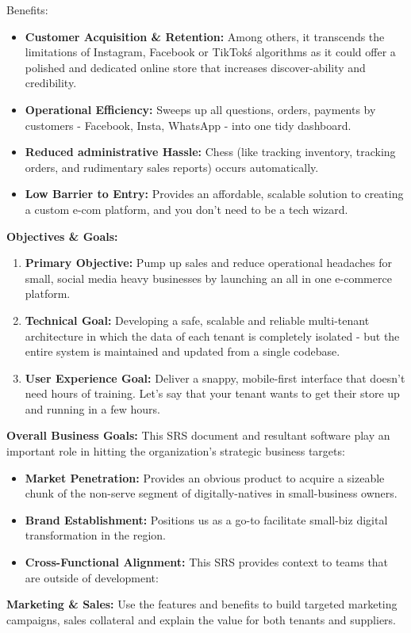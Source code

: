 Benefits:  
\begin{itemize}
For Small Businesspersons (Tenants):  
    \item \textbf{Customer Acquisition \& Retention:} Among others, it transcends the limitations of Instagram, Facebook or TikTok\'s algorithms as it could offer a polished and dedicated online store that increases discover-ability and credibility.  
    \item \textbf{Operational Efficiency:} Sweeps up all questions, orders, payments by customers - Facebook, Insta, WhatsApp - into one tidy dashboard. 
    \item \textbf{Reduced administrative Hassle:} Chess (like tracking inventory, tracking orders, and rudimentary sales reports) occurs automatically.  
    \item \textbf{Low Barrier to Entry:} Provides an affordable, scalable solution to creating a custom e-com platform, and you don't need to be a tech wizard.  
\end{itemize}
\textbf{Objectives \& Goals:}
\begin{enumerate}
    \item \textbf{Primary Objective:} Pump up sales and reduce operational headaches for small, social media heavy businesses by launching an all in one e-commerce platform.  
    \item \textbf{Technical Goal:} Developing a safe, scalable and reliable multi-tenant architecture in which the data of each tenant is completely isolated - but the entire system is maintained and updated from a single codebase.
    \item \textbf{User Experience Goal:} Deliver a snappy, mobile-first interface that doesn't need hours of training. Let's say that your tenant wants to get their store up and running in a few hours.  
\end{enumerate}

\textbf{Overall Business Goals:}  
This SRS document and resultant software play an important role in hitting the organization's strategic business targets:  
\begin{itemize}
    \item \textbf{Market Penetration:} Provides an obvious product to acquire a sizeable chunk of the non-serve segment of digitally-natives in small-business owners.  
    \item \textbf{Brand Establishment:} Positions us as a go-to facilitate small-biz digital transformation in the region.  
    \item \textbf{Cross-Functional Alignment:} This SRS provides context to teams that are outside of development:  
\end{itemize}
\textbf{Marketing \& Sales:} Use the features and benefits to build targeted marketing campaigns, sales collateral and explain the value for both tenants and suppliers. 

